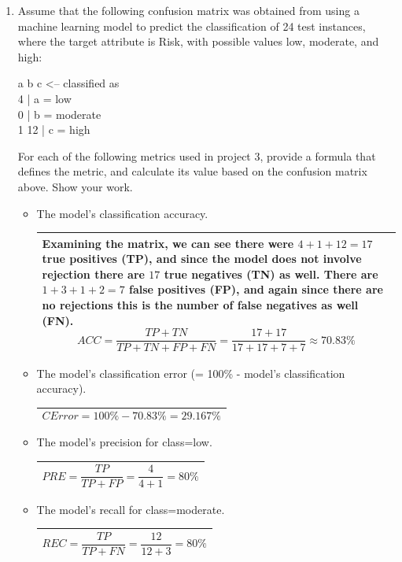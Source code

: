 \documentclass[10pt]{article}
\newenvironment{answer}
    {\begin{center}
    \begin{tabular}{|p{0.9\textwidth}|}
    \hline
    }
    { 
    \\\hline
    \end{tabular} 
    \end{center}
    }
\begin{document}
  \begin{enumerate}[resume]
  \item Assume that the following confusion matrix was obtained from using a machine learning
    model to predict the classification of 24 test instances, where the target attribute is Risk,
    with possible values low, moderate, and high:
    \begin{center}
      \begin{minipage}{0.4\textwidth}
        {\selectfont
          \raggedright{
            a \space b \space c <-- classified as \\
            4    | a = low \\
            0    | b = moderate \\
            1  12 | c = high \\
          }
        }
      \end{minipage}
    \end{center}
    For each of the following metrics used in project 3, provide a formula that defines the
    metric, and calculate its value based on the confusion matrix above. Show your work.
    
    \begin{itemize}
    \item The model's classification accuracy.
      \begin{answer}
        Examining the matrix, we can see there were $4 + 1 + 12=17$ true positives (TP), and since the model does not involve rejection there are $17$ true negatives (TN) as well. There are $1+3+1+2=7$ false positives (FP), and again since there are no rejections this is the number of false negatives as well (FN).
        $$ACC = \frac{TP+TN}{TP + TN + FP + FN} = \frac{17+17}{17+17+7+7} \approx 70.83\%$$
      \end{answer}
    \item The model's classification error (= 100\% - model's classification accuracy).
      \begin{answer}
        \[CError = 100\% - 70.83\% = 29.167\%\]
      \end{answer}
    \item The model's precision for class=low.
      \begin{answer}
        \[ PRE = \frac{TP}{TP+FP} = \frac{4}{4+1} = 80\% \]
      \end{answer}
    \item The model's recall for class=moderate.
      \begin{answer}
        \[ REC = \frac{TP}{TP+FN} = \frac{12}{12+3} = 80\% \]
      \end{answer}
    \end{itemize}
  \end{enumerate}
\end{document}
